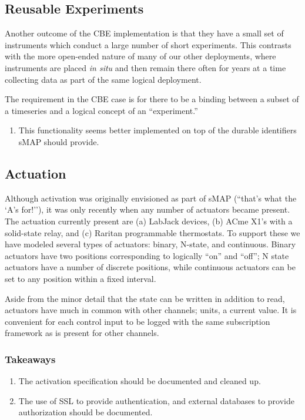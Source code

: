 \documentclass[10pt,letterpaper]{article}
\newcommand{\smap}{sMAP}
\begin{document}
\subsection{Reusable Experiments}

Another outcome of the CBE implementation is that they have a small set of
instruments which conduct a large number of short experiments.  This contrasts
with the more open-ended nature of many of our other deployments, where
instruments are placed {\it in situ} and then remain there often for years at
a time collecting data as part of the same logical deployment.

The requirement in the CBE case is for there to be a binding between a subset
of a timeseries and a logical concept of an ``experiment.''  

\begin{enumerate}
\item This functionality seems better implemented on top of the durable
  identifiers \smap{} should provide.  
\end{enumerate}

\subsection{Actuation}

Although activation was originally envisioned as part of \smap{} (``that's
what the `A's for!''), it was only recently when any number of actuators
became present.  The actuation currently present are (a) LabJack devices, (b)
ACme X1's with a solid-state relay, and (c) Raritan programmable thermostats.  
%
To support these we have modeled several types of actuators: binary, N-state,
and continuous.  Binary actuators have two positions corresponding to
logically ``on'' and ``off''; N state actuators have a number of discrete
positions, while continuous actuators can be set to any position within a
fixed interval.

Aside from the minor detail that the state can be written in addition to read,
actuators have much in common with other channels; units, a current value.
It is convenient for each control input to be logged with the same
subscription framework as is present for other channels. 

\subsubsection{Takeaways}
\begin{enumerate}
\item The activation specification should be documented and cleaned up.
\item The use of SSL to provide authentication, and external databases to
  provide authorization should be documented.
\end{enumerate}
\end{document}
